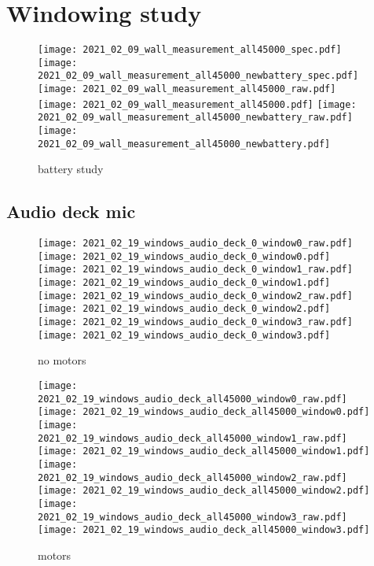 \section{Windowing study}

\begin{figure}[h]
  \centering
  \begin{minipage}{\textwidth}
  \centering
  \texttt{[image: 2021\_02\_09\_wall\_measurement\_all45000\_spec.pdf]}
  \texttt{[image: 2021\_02\_09\_wall\_measurement\_all45000\_newbattery\_spec.pdf]}
  \texttt{[image: 2021\_02\_09\_wall\_measurement\_all45000\_raw.pdf]}
  \texttt{[image: 2021\_02\_09\_wall\_measurement\_all45000.pdf]}
  \texttt{[image: 2021\_02\_09\_wall\_measurement\_all45000\_newbattery\_raw.pdf]}
  \texttt{[image: 2021\_02\_09\_wall\_measurement\_all45000\_newbattery.pdf]}
  \end{minipage}
  \caption{battery study}
  \label{fig:battery-motors}
\end{figure}

\subsection{Audio deck mic}
\begin{figure}[h]
  \centering
  \begin{minipage}{\textwidth}
  \centering
  \texttt{[image: 2021\_02\_19\_windows\_audio\_deck\_0\_window0\_raw.pdf]}
  \texttt{[image: 2021\_02\_19\_windows\_audio\_deck\_0\_window0.pdf]}
  \texttt{[image: 2021\_02\_19\_windows\_audio\_deck\_0\_window1\_raw.pdf]}
  \texttt{[image: 2021\_02\_19\_windows\_audio\_deck\_0\_window1.pdf]}
  \texttt{[image: 2021\_02\_19\_windows\_audio\_deck\_0\_window2\_raw.pdf]}
  \texttt{[image: 2021\_02\_19\_windows\_audio\_deck\_0\_window2.pdf]}
  \texttt{[image: 2021\_02\_19\_windows\_audio\_deck\_0\_window3\_raw.pdf]}
  \texttt{[image: 2021\_02\_19\_windows\_audio\_deck\_0\_window3.pdf]}
  \end{minipage}
  \caption{no motors}
  \label{fig:audio_deck-no-motors}
\end{figure}

\begin{figure}[h]
  \centering
  \begin{minipage}{\textwidth}
  \centering
  \texttt{[image: 2021\_02\_19\_windows\_audio\_deck\_all45000\_window0\_raw.pdf]}
  \texttt{[image: 2021\_02\_19\_windows\_audio\_deck\_all45000\_window0.pdf]}
  \texttt{[image: 2021\_02\_19\_windows\_audio\_deck\_all45000\_window1\_raw.pdf]}
  \texttt{[image: 2021\_02\_19\_windows\_audio\_deck\_all45000\_window1.pdf]}
  \texttt{[image: 2021\_02\_19\_windows\_audio\_deck\_all45000\_window2\_raw.pdf]}
  \texttt{[image: 2021\_02\_19\_windows\_audio\_deck\_all45000\_window2.pdf]}
  \texttt{[image: 2021\_02\_19\_windows\_audio\_deck\_all45000\_window3\_raw.pdf]}
  \texttt{[image: 2021\_02\_19\_windows\_audio\_deck\_all45000\_window3.pdf]}
  \end{minipage}
  \caption{motors}
  \label{fig:audio_deck-motors}
\end{figure}


